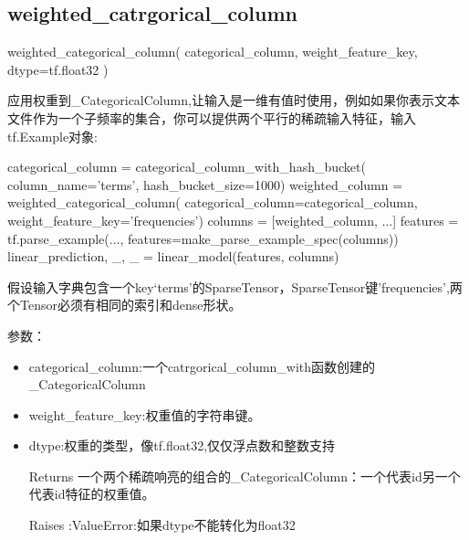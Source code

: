 \subsection{weighted\_catrgorical\_column}
\begin{python}
weighted_categorical_column(
    categorical_column,
    weight_feature_key,
    dtype=tf.float32
)
\end{python}
应用权重到\_CategoricalColumn,让输入是一维有值时使用，例如如果你表示文本文件作为一个子频率的集合，你可以提供两个平行的稀疏输入特征，输入tf.Example对象:
\begin{python}
\end{python}
\begin{python}
categorical_column = categorical_column_with_hash_bucket(
    column_name='terms', hash_bucket_size=1000)
weighted_column = weighted_categorical_column(
    categorical_column=categorical_column, weight_feature_key='frequencies')
columns = [weighted_column, ...]
features = tf.parse_example(..., features=make_parse_example_spec(columns))
linear_prediction, _, _ = linear_model(features, columns)
\end{python}
假设输入字典包含一个key‘terms’的SparseTensor，SparseTensor键'frequencies',两个Tensor必须有相同的索引和dense形状。

参数：
\begin{itemize}
	\item categorical\_column:一个catrgorical\_column\_with\*函数创建的\_CategoricalColumn
	\item weight\_feature\_key:权重值的字符串键。
	\item dtype:权重的类型，像tf.float32,仅仅浮点数和整数支持
	\item[Returns]一个两个稀疏响亮的组合的\_CategoricalColumn：一个代表id另一个代表id特征的权重值。
	\item[Raises]:ValueError:如果dtype不能转化为float32
	\end{itemize}